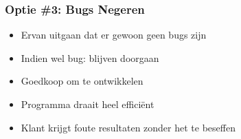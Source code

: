 \begin{frame}
  \frametitle{Optie \#3: Bugs Negeren}
  \begin{itemize}
    \item Ervan uitgaan dat er gewoon geen bugs zijn
    \item Indien wel bug: blijven doorgaan
  \end{itemize}
  \vskip4mm
  \begin{itemize}
    \item[\pro] Goedkoop om te ontwikkelen
    \item[\pro] Programma draait heel effici\"ent
    \item[\con] Klant krijgt foute resultaten zonder het te beseffen
  \end{itemize}
\end{frame}

